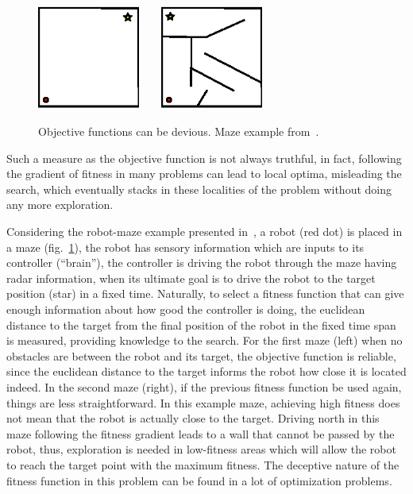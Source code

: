 \begin{figure}
\centering
\includegraphics[width=0.3\textwidth]{../Figures/Misc/mazeEasy.eps}\  \ \   \   
\includegraphics[width=0.3\textwidth]{../Figures/Misc/maze.eps}
\caption{Objective functions can be devious. Maze example from~\cite{lehman2011abandoning}.}
\label{fig:maze}
\end{figure}

Such a measure as the objective function is not always truthful, in fact, following the gradient of fitness in many problems can lead to local optima, misleading the search, which eventually stacks in these localities of the problem without doing any more exploration. 

Considering the robot-maze example presented in~\cite{lehman2011abandoning,lehman2010revising}, a robot (red dot) is placed in a maze (fig.~\ref{fig:maze}), the robot has sensory information which are inputs to its controller (``brain''), the controller is driving the robot through the maze having radar information, when its ultimate goal is to drive the robot to the target position (star) in a fixed time. Naturally, to select a fitness function that can give enough information about how good the controller is doing, the euclidean distance to the target from the final position of the robot in the fixed time span is measured, providing knowledge to the search. For the first maze (left) when no obstacles are between the robot and its target, the objective function is reliable, since the euclidean distance to the target informs the robot how close it is located indeed. In the second maze (right), if the previous fitness function be used again, things are less straightforward. In this example maze, achieving high fitness does not mean that the robot is actually close to the target. Driving north in this maze following the fitness gradient leads to a wall that cannot be passed by the robot, thus, exploration is needed in low-fitness areas which will allow the robot to reach the target point with the maximum fitness. The deceptive nature of the fitness function in this problem can be found in a lot of optimization problems.

